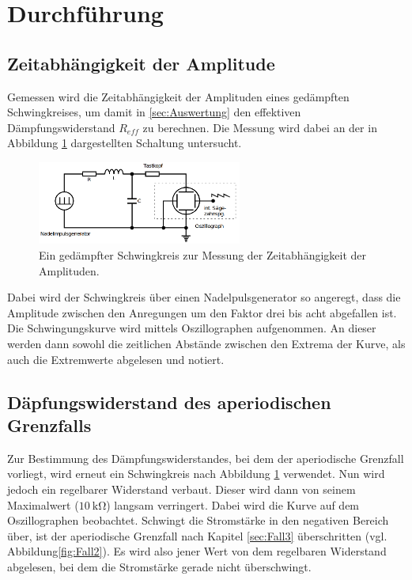 \section{Durchführung}
\label{sec:Durchführung}
\subsection{Zeitabhängigkeit der Amplitude}
\label{sec:a}
Gemessen wird die Zeitabhängigkeit der Amplituden eines gedämpften Schwingkreises, um damit in \ref{sec:Auswertung} den effektiven Dämpfungswiderstand
$R_{eff}$ zu berechnen. Die Messung wird dabei an der in Abbildung \ref{fig:a} dargestellten Schaltung untersucht.
\begin{figure}[H]
    \centering
    \includegraphics[width=0.6\textwidth]{pictures/Aufbau_a.png}
    \caption{Ein gedämpfter Schwingkreis zur Messung der Zeitabhängigkeit der Amplituden.\cite{AP01}}
    \label{fig:a}
\end{figure}
\noindent
Dabei wird der Schwingkreis über einen Nadelpulsgenerator so angeregt, dass die Amplitude zwischen den Anregungen um den Faktor drei bis acht
abgefallen ist. Die Schwingungskurve wird mittels Oszillographen aufgenommen. An dieser werden dann sowohl die zeitlichen Abstände zwischen den Extrema
der Kurve, als auch die Extremwerte abgelesen und notiert.

\subsection{Däpfungswiderstand des aperiodischen Grenzfalls}
\label{sec:b}
Zur Bestimmung des Dämpfungswiderstandes, bei dem der aperiodische Grenzfall vorliegt, wird erneut ein Schwingkreis nach Abbildung \ref{fig:a}
verwendet. Nun wird jedoch ein regelbarer Widerstand verbaut. Dieser wird dann von seinem Maximalwert ($\SI{10}{\kilo\ohm}$) langsam verringert.
Dabei wird die Kurve auf dem Oszillographen beobachtet. Schwingt die Stromstärke in den negativen Bereich über, ist der aperiodische Grenzfall
nach Kapitel \ref{sec:Fall3} überschritten (vgl. Abbildung\ref{fig:Fall2}). Es wird also jener Wert von dem regelbaren Widerstand abgelesen, bei
dem die Stromstärke gerade nicht überschwingt.


